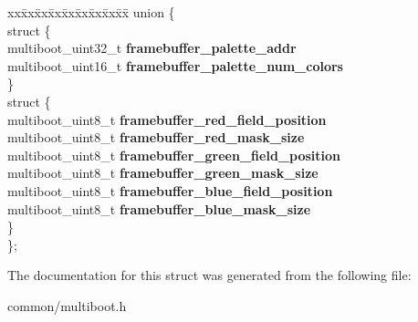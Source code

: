 \begin{DoxyCompactItemize}
\item 
\begin{tabbing}
xx\=xx\=xx\=xx\=xx\=xx\=xx\=xx\=xx\=\kill
union \{\\
\>struct \{\\
\>\>multiboot\_uint32\_t {\bfseries framebuffer\_palette\_addr}\\
\>\>multiboot\_uint16\_t {\bfseries framebuffer\_palette\_num\_colors}\\
\>\} \hypertarget{unionmultiboot__info_1_1_0D1_a91acae8a6d9ae367e6c7f329993e3d4f}{}\label{unionmultiboot__info_1_1_0D1_a91acae8a6d9ae367e6c7f329993e3d4f}
\\
\>struct \{\\
\>\>multiboot\_uint8\_t {\bfseries framebuffer\_red\_field\_position}\\
\>\>multiboot\_uint8\_t {\bfseries framebuffer\_red\_mask\_size}\\
\>\>multiboot\_uint8\_t {\bfseries framebuffer\_green\_field\_position}\\
\>\>multiboot\_uint8\_t {\bfseries framebuffer\_green\_mask\_size}\\
\>\>multiboot\_uint8\_t {\bfseries framebuffer\_blue\_field\_position}\\
\>\>multiboot\_uint8\_t {\bfseries framebuffer\_blue\_mask\_size}\\
\>\} \hypertarget{unionmultiboot__info_1_1_0D1_a878a8c15a40bb915802f2809d0d9dbc0}{}\label{unionmultiboot__info_1_1_0D1_a878a8c15a40bb915802f2809d0d9dbc0}
\\
\}; \hypertarget{structmultiboot__info_af694b7644759d2f7526a0b9182426207}{}\label{structmultiboot__info_af694b7644759d2f7526a0b9182426207}
\\

\end{tabbing}\end{DoxyCompactItemize}


The documentation for this struct was generated from the following file\+:\begin{DoxyCompactItemize}
\item 
common/multiboot.\+h\end{DoxyCompactItemize}
